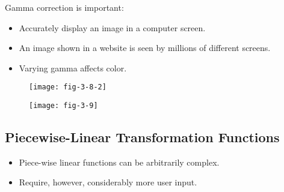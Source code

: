 
\begin{frame}
Gamma correction is important:
\begin{itemize}
\item Accurately display an image in a computer screen.
\item An image shown in a website is seen by millions of different screens.
\item Varying gamma affects color.
\end{itemize}
\end{frame}


\begin{frame}
\begin{figure}
\centering
\texttt{[image: fig-3-8-2]}
\end{figure}
\end{frame}


\begin{frame}
\begin{figure}
\centering
\texttt{[image: fig-3-9]}
\end{figure}
\end{frame}


\subsection{Piecewise-Linear Transformation Functions}


\begin{frame}
\begin{itemize}
\item Piece-wise linear functions can be arbitrarily complex.
\item Require, however, considerably more user input.
\end{itemize}
\end{frame}


